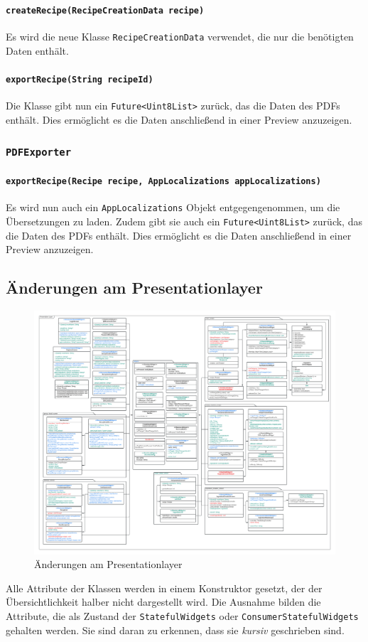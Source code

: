 \documentclass{implementierungsheft}
\begin{document}
\paragraph{\texttt{createRecipe(RecipeCreationData recipe)}}
Es wird die neue Klasse \texttt{RecipeCreationData} verwendet, die nur die benötigten Daten enthält.
\paragraph{\texttt{exportRecipe(String recipeId)}}
Die Klasse gibt nun ein \texttt{Future<Uint8List>} zurück, das die Daten des PDFs enthält. Dies ermöglicht es die Daten anschließend in einer Preview anzuzeigen.
\subsubsection{\texttt{PDFExporter}}
\paragraph{\texttt{exportRecipe(Recipe recipe, AppLocalizations appLocalizations)}}
Es wird nun auch ein \texttt{AppLocalizations} Objekt entgegengenommen, um die Übersetzungen zu laden. Zudem gibt sie auch ein \texttt{Future<Uint8List>} zurück, das die Daten des PDFs enthält. Dies ermöglicht es die Daten anschließend in einer Preview anzuzeigen.
\newpage
\subsection{Änderungen am Presentationlayer}
\begin{figure}[htp]
    \centering
    \includegraphics[width=\textwidth]{images/uml/presentationLayer.pdf}
    \caption{Änderungen am Presentationlayer}
    \label{fig:presentationLayer}
\end{figure}
Alle Attribute der Klassen werden in einem Konstruktor gesetzt, der der Übersichtlichkeit halber nicht dargestellt wird. Die Ausnahme bilden die Attribute, die als Zustand der \texttt{StatefulWidgets} oder \texttt{ConsumerStatefulWidgets} gehalten werden. Sie sind daran zu erkennen, dass sie \textit{kursiv} geschrieben sind.
\end{document}
